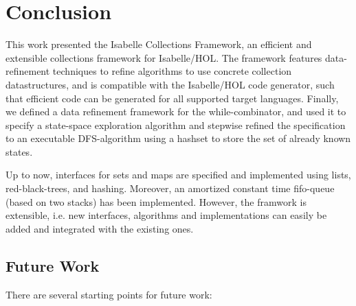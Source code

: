\section{Conclusion}\label{sec:conclusion}

This work presented the Isabelle Collections Framework, an efficient and extensible collections framework for Isabelle/HOL.
The framework features data-refinement techniques to refine algorithms to use concrete collection datastructures,
and is compatible with the Isabelle/HOL code generator, such that efficient code can be generated for all supported target languages.
Finally, we defined a data refinement framework for the while-combinator, and used it to specify a state-space exploration algorithm
and stepwise refined the specification to an executable DFS-algorithm using a hashset to store the set of already known states.

Up to now, interfaces for sets and maps are specified and implemented using lists, red-black-trees, and hashing. Moreover, an amortized constant time 
fifo-queue (based on two stacks) has been implemented. However, the framwork is extensible, i.e. new interfaces, algorithms and implementations can easily be added and integrated with the existing ones.

\subsection{Future Work}
There are several starting points for future work:

